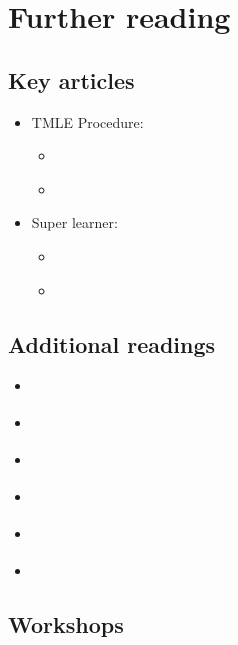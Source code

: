 \documentclass[
]{book}
\providecommand{\tightlist}{%
  \setlength{\itemsep}{0pt}\setlength{\parskip}{0pt}}
\begin{document}
\hypertarget{further-reading}{%
\section{Further reading}\label{further-reading}}

\hypertarget{key-articles}{%
\subsection{Key articles}\label{key-articles}}

\begin{itemize}
\tightlist
\item
  TMLE Procedure:

  \begin{itemize}
  \tightlist
  \item
    \citet{luque2018targeted}
  \item
    \citet{schuler2017targeted}
  \end{itemize}
\item
  Super learner:

  \begin{itemize}
  \tightlist
  \item
    \citet{rose2013mortality}
  \item
    \citet{naimi2018stacked}
  \end{itemize}
\end{itemize}

\hypertarget{additional-readings}{%
\subsection{Additional readings}\label{additional-readings}}

\begin{itemize}
\tightlist
\item
  \citet{rose2020intersections}
\item
  \citet{snowden2011implementation}
\item
  \citet{naimi2017introduction}
\item
  \citet{austin2015moving}
\item
  \citet{naimi2017challenges}
\item
  \citet{balzer2021demystifying}
\end{itemize}

\hypertarget{workshops}{%
\subsection{Workshops}\label{workshops}}
\end{document}
